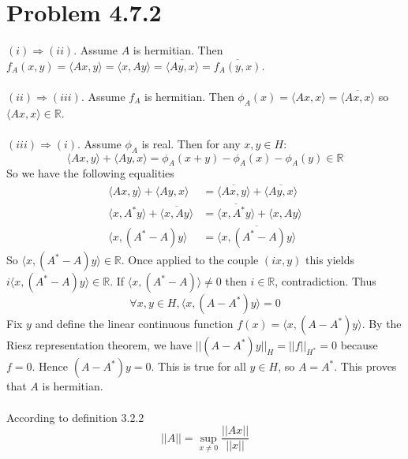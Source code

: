 \documentclass[11pt,a4paper]{article}
\newcommand{\R}{\mathbb{R}}
\newcommand{\1}{\mathbbm{1}}
\begin{document}
\section*{Problem 4.7.2}
$(i) \Rightarrow (ii)$. Assume $A$ is hermitian. Then $f_A(x,y) = \langle Ax, y \rangle = \langle x, Ay \rangle = \overline{\langle Ay , x \rangle} = \overline{ f_A(y,x) }$.\\\\
$(ii) \Rightarrow (iii)$. Assume $f_A$ is hermitian. Then $\phi_A(x) = \langle Ax, x \rangle = \overline{ \langle Ax , x \rangle}$ so $\langle Ax , x \rangle \in \R$.\\\\
$(iii) \Rightarrow (i)$. Assume $\phi_A$ is real. Then for any $x,y \in H$:
\[ \langle Ax , y \rangle + \langle Ay , x \rangle = \phi_A(x+y) - \phi_A(x) - \phi_A(y) \in \R \]
So we have the following equalities
\begin{align*}
\langle Ax , y \rangle + \langle Ay , x \rangle & = \overline{\langle Ax , y \rangle} + \overline{\langle Ay , x \rangle} \\ \langle x , A^* y \rangle + \overline{\langle x , A y \rangle} & = \overline{\langle x , A^* y \rangle} + \langle x , Ay \rangle \\
\langle x , (A^* - A) y \rangle & = \overline{\langle x , (A^*-A) y \rangle}
\end{align*}
So $\langle x , (A^* - A) y \rangle \in \R$. Once applied to the couple $(ix,y)$ this yields $i \langle x , (A^* - A)y \rangle \in \R$. If $\langle x , (A^* - A) \rangle \neq 0$ then $i \in \R$, contradiction. Thus
\[ \forall x,y \in H, \langle x, (A-A^*)y \rangle = 0 \]
Fix $y$ and define the linear continuous function $f(x) = \langle x , (A-A^*)y \rangle$. By the Riesz representation theorem, we have $||(A-A^*)y||_H = ||f||_{H^*} = 0$ because $f = 0$. Hence $(A-A^*)y = 0$. This is true for all $y \in H$, so $A = A^*$. This proves that $A$ is hermitian.\\\\
According to definition 3.2.2
\[ ||A|| = \sup_{x \neq 0} \frac{||Ax||}{||x||} \]
\end{document}
